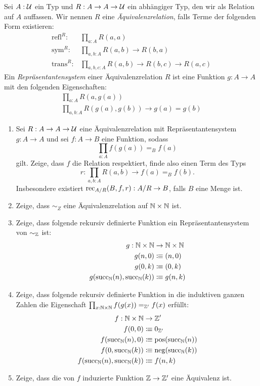 \documentclass{uebung}
\begin{document}
\begin{bonus}
  Sei $A:\mathcal{U}$ ein Typ und $R:A \to A \to \mathcal{U}$ ein abhängiger Typ, den wir als Relation auf $A$ auffassen.
  Wir nennen $R$ eine \emph{Äquivalenzrelation}, falls Terme der folgenden Form existieren:
  \begin{align*}
    \mathrm{refl}^R :   & \prod_{a:A} R(a,a)\\
    \mathrm{sym}^R :    & \prod_{a,b:A} R(a,b) \to R(b,a)\\
    \mathrm{trans}^R :  & \prod_{a,b,c:A} R(a,b) \to R(b,c) \to R(a,c)
  \end{align*}
  Ein \emph{Repräsentantensystem} einer Äquivalenzrelation $R$ ist eine Funktion $g:A \to A$ mit den folgenden Eigenschaften:
  \begin{gather*}
    \prod_{a:A} R(a,g(a))\\
    \prod_{a,b:A} R(g(a),g(b)) \to g(a) = g(b)
  \end{gather*}

  \begin{enumerate}
    \item Sei $R:A \to A \to\mathcal{U}$ eine Äquivalenzrelation mit Repräsentantensystem $g:A \to A$ und sei $f:A \to B$ eine Funktion, sodass
      $$
      \prod_{a:A} f(g(a)) =_B f(a)
      $$
      gilt.
      Zeige, dass $f$ die Relation respektiert, finde also einen Term des Typs
      $$
      r:\prod_{a,b:A} R(a,b) \to f(a) =_B f(b).
      $$
      Insbesondere existiert $\mathrm{rec}_{A/R}(B,f,r):A/R\to B$, falls $B$ eine Menge ist.
    \item Zeige, dass $\sim_Z$ eine Äquivalenzrelation auf $\mathbb{N}\times\mathbb{N}$ ist.
    \item Zeige, dass folgende rekursiv definierte Funktion ein Repräsentantensystem von $\sim_{\mathbb{Z}}$ ist:
      \begin{align*}
        g : \mathbb{N}\times\mathbb{N} &\to \mathbb{N}\times\mathbb{N}\\
        g(n,0) &\vcentcolon\mspace{-1.2mu}\equiv (n,0)\\
        g(0,k) &\vcentcolon\mspace{-1.2mu}\equiv (0,k)\\
        g(\mathrm{succ}_{\mathbb{N}}(n),\mathrm{succ}_{\mathbb{N}}(k)) &\vcentcolon\mspace{-1.2mu}\equiv g(n,k)
      \end{align*}
    \item Zeige, dass folgende rekursiv definierte Funktion in die induktiven ganzen Zahlen die Eigenschaft $\prod_{x:\mathbb{N}\times \mathbb{N}} f(g(x)) =_{\mathbb{Z}'} f(x)$ erfüllt:
      \begin{align*}
        f:\mathbb{N}\times\mathbb{N} &\to \mathbb{Z}'\\
        f(0,0)       &\vcentcolon\mspace{-1.2mu}\equiv 0_{\mathbb{Z}'}\\
        f(\mathrm{succ}_{\mathbb{N}}(n),0) &\vcentcolon\mspace{-1.2mu}\equiv \mathrm{pos}(\mathrm{succ}_{\mathbb{N}}(n))\\
        f(0,\mathrm{succ}_{\mathbb{N}}(k)) &\vcentcolon\mspace{-1.2mu}\equiv \mathrm{neg}(\mathrm{succ}_{\mathbb{N}}(k))\\
        f(\mathrm{succ}_{\mathbb{N}}(n),\mathrm{succ}_{\mathbb{N}}(k)) &\vcentcolon\mspace{-1.2mu}\equiv f(n,k)
      \end{align*}
    \item Zeige, dass die von $f$ induzierte Funktion $\mathbb{Z}\to\mathbb{Z}'$ eine Äquivalenz ist.
  \end{enumerate}
\end{bonus}
\end{document}
